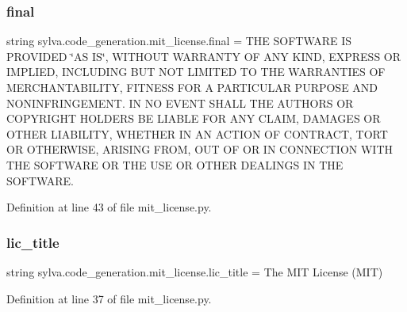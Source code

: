 \subsubsection{\texorpdfstring{final}{final}}
{\footnotesize\ttfamily string sylva.\+code\+\_\+generation.\+mit\+\_\+license.\+final = \textquotesingle{}T\+HE S\+O\+F\+T\+W\+A\+RE IS P\+R\+O\+V\+I\+D\+ED \char`\"{}AS IS\char`\"{}, W\+I\+T\+H\+O\+UT W\+A\+R\+R\+A\+N\+TY OF A\+NY K\+I\+ND, E\+X\+P\+R\+E\+SS OR I\+M\+P\+L\+I\+ED, I\+N\+C\+L\+U\+D\+I\+NG B\+UT N\+OT L\+I\+M\+I\+T\+ED TO T\+HE W\+A\+R\+R\+A\+N\+T\+I\+ES OF M\+E\+R\+C\+H\+A\+N\+T\+A\+B\+I\+L\+I\+TY, F\+I\+T\+N\+E\+SS F\+OR A P\+A\+R\+T\+I\+C\+U\+L\+AR P\+U\+R\+P\+O\+SE A\+ND N\+O\+N\+I\+N\+F\+R\+I\+N\+G\+E\+M\+E\+N\+T. IN NO E\+V\+E\+NT S\+H\+A\+LL T\+HE A\+U\+T\+H\+O\+RS OR C\+O\+P\+Y\+R\+I\+G\+HT H\+O\+L\+D\+E\+RS BE L\+I\+A\+B\+LE F\+OR A\+NY C\+L\+A\+IM, D\+A\+M\+A\+G\+ES OR O\+T\+H\+ER L\+I\+A\+B\+I\+L\+I\+TY, W\+H\+E\+T\+H\+ER IN AN A\+C\+T\+I\+ON OF C\+O\+N\+T\+R\+A\+CT, T\+O\+RT OR O\+T\+H\+E\+R\+W\+I\+SE, A\+R\+I\+S\+I\+NG F\+R\+OM, O\+UT OF OR IN C\+O\+N\+N\+E\+C\+T\+I\+ON W\+I\+TH T\+HE S\+O\+F\+T\+W\+A\+RE OR T\+HE U\+SE OR O\+T\+H\+ER D\+E\+A\+L\+I\+N\+GS IN T\+HE S\+O\+F\+T\+W\+A\+R\+E.\textquotesingle{}}



Definition at line 43 of file mit\+\_\+license.\+py.

\mbox{\label{namespacesylva_1_1code__generation_1_1mit__license_a85aa303c71412d6df9e78ae4d0de5c28}} 
\subsubsection{\texorpdfstring{lic\+\_\+title}{lic\_title}}
{\footnotesize\ttfamily string sylva.\+code\+\_\+generation.\+mit\+\_\+license.\+lic\+\_\+title = \textquotesingle{}The M\+IT License (M\+IT)\textquotesingle{}}



Definition at line 37 of file mit\+\_\+license.\+py.

\mbox{\label{namespacesylva_1_1code__generation_1_1mit__license_af67ea5ac7bf8aeac183aefb908f601e2}} 
